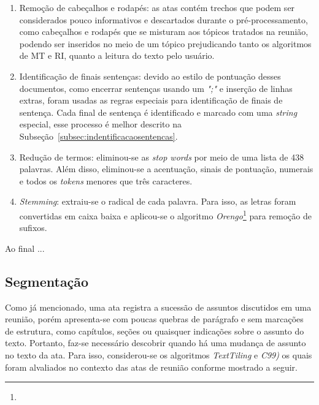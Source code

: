 \begin{enumerate}

\item Remoção de cabeçalhos e rodapés: as atas contém trechos que podem ser considerados pouco informativos e descartados durante o pré-processamento, como cabeçalhos e rodapés que se misturam aos tópicos tratados na reunião, podendo ser  inseridos no meio de um tópico prejudicando tanto os algoritmos de MT e RI, quanto a leitura do texto pelo usuário.

\item Identificação de finais sentenças: devido ao estilo de pontuação desses documentos, como encerrar sentenças usando um \textit{";"} e inserção de linhas extras, foram usadas as regras especiais para identificação de finais de sentença. Cada final de sentença é identificado e marcado com uma \textit{string} especial, esse processo é melhor descrito na Subseção~\ref{subsec:indentificacaosentencas}.



\item Redução de termos: eliminou-se as \textit{stop words} por meio de uma lista de 438 palavras. Além disso, eliminou-se a acentuação, sinais de pontuação, numerais e todos os \textit{tokens} menores que três caracteres. 

\item \textit{Stemming}: extraiu-se o radical de cada palavra. Para isso, as letras foram convertidas em caixa baixa e aplicou-se o algoritmo \textit{Orengo}\footnote{\urlorengo} para remoção de sufixos.

\end{enumerate}



Ao final ...


\subsection{Segmentação}


Como já mencionado, uma ata registra a sucessão de assuntos discutidos em uma reunião, porém apresenta-se com poucas quebras de parágrafo e sem marcações de estrutura, como capítulos, seções ou quaisquer indicações sobre o assunto do texto. Portanto, faz-se necessário descobrir quando há uma mudança de assunto no texto da ata. Para isso, considerou-se os algoritmos \textit{TextTiling} e \textit{C99)} os quais foram alvaliados no contexto das atas de reunião conforme mostrado a seguir.

